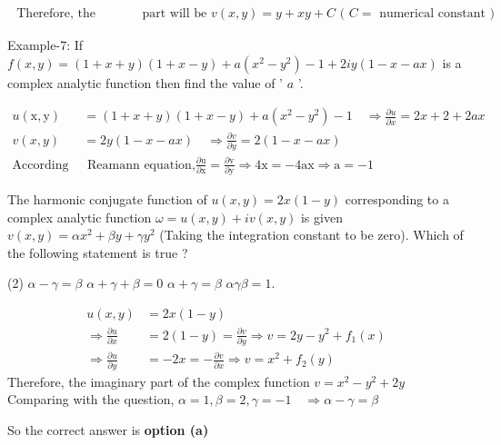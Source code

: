 \begin{note}
\begin{answer}
\begin{align*}
	\text{	Therefore, the imaginary }&\text{part will be }v(x, y)=y+x y+C
	\text{	( $C=$ numerical constant )}
		\end{align*}
	\end{answer}
	\begin{exercise}
		Example-7: If $f(x, y)=(1+x+y)(1+x-y)+a\left(x^{2}-y^{2}\right)-1+2 i y(1-x-a x)$ is a complex analytic function then find the value of ' $a$ '.
	\end{exercise}
	\begin{answer}
		\begin{align*}
		u(\mathrm{x}, \mathrm{y})&=(1+x+y)(1+x-y)+a\left(x^{2}-y^{2}\right)-1 \quad \Rightarrow \frac{\partial u}{\partial x}=2 x+2+2 a x \\
		v(x, y)&=2 y(1-x-a x) \quad \Rightarrow \frac{\partial v}{\partial y}=2(1-x-a x)\\
		\text{According to Cauchy  }&\text{ Reamann equation,}\frac{\partial \mathrm{u}}{\partial \mathrm{x}}=\frac{\partial \mathrm{v}}{\partial \mathrm{y}} \Rightarrow 4 \mathrm{x}=-4 \mathrm{ax} \Rightarrow \mathrm{a}=-1
		\end{align*}
	\end{answer}
	\begin{exercise}
		The harmonic conjugate function of $u(x, y)=2 x(1-y)$ corresponding to a complex analytic function $\omega=u(x, y)+i v(x, y)$ is given $v(x, y)=\alpha x^{2}+\beta y+\gamma y^{2}$ (Taking the integration constant to be zero).
		Which of the following statement is true ?
		 \begin{tasks}(2)
			\task[\textbf{a.}]$\alpha-\gamma=\beta$
			\task[\textbf{b.}]$\alpha+\gamma+\beta=0$
			\task[\textbf{c.}]$\alpha+\gamma=\beta$
			\task[\textbf{d.}] $\alpha \gamma \beta=1$.
		\end{tasks}
	\end{exercise}
	\begin{answer}
		\begin{align*}
		u(x, y)&=2 x(1-y) \\
		\Rightarrow \frac{\partial u}{\partial x}&=2(1-y)=\frac{\partial v}{\partial y} \Rightarrow v=2 y-y^{2}+f_{1}(x) \\
		\Rightarrow \frac{\partial u}{\partial y}&=-2 x=-\frac{\partial v}{\partial x} \Rightarrow v=x^{2}+f_{2}(y)
		\end{align*}
			Therefore, the imaginary part of the complex function $v=x^{2}-y^{2}+2 y$ \\Comparing with the question, $\alpha=1, \beta=2, \gamma=-1 \quad \Rightarrow \alpha-\gamma=\beta$
	\end{answer}
	So the correct answer is \textbf{option (a)}

\end{note}
